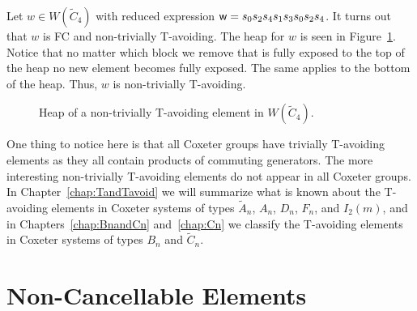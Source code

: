 \begin{example}
Let $w \in W(\widetilde{C}_4)$ with reduced expression $\mathsf{w}=s_0s_2s_4s_1s_3s_0s_2s_4$. It turns out that $w$ is FC and non-trivially T-avoiding. The heap for $w$ is seen in Figure~\ref{fig:sandwich1}. Notice that no matter which block we remove that is fully exposed to the top of the heap no new element becomes fully exposed. The same applies to the bottom of the heap. Thus, $w$ is non-trivially T-avoiding. 
\begin{figure}[h!]
\centering
{}
\caption{Heap of a non-trivially T-avoiding element in $W(\widetilde{C}_4)$.}\label{fig:sandwich1}	
\end{figure}
\end{example}


One thing to notice here is that all Coxeter groups have trivially T-avoiding elements as they all contain products of commuting generators. The more interesting non-trivially T-avoiding elements do not appear in all Coxeter groups. In Chapter~\ref{chap:TandTavoid} we will summarize what is known about the T-avoiding elements in Coxeter systems of types $\widetilde{A}_n$, $A_n$, $D_n$, $F_n$, and $I_2(m)$, and in Chapters~\ref{chap:BnandCn} and~\ref{chap:Cn} we classify the T-avoiding elements in Coxeter systems of types $B_n$ and $\widetilde{C}_n$. 




\section{Non-Cancellable Elements}\label{sec:noncancel}
 
